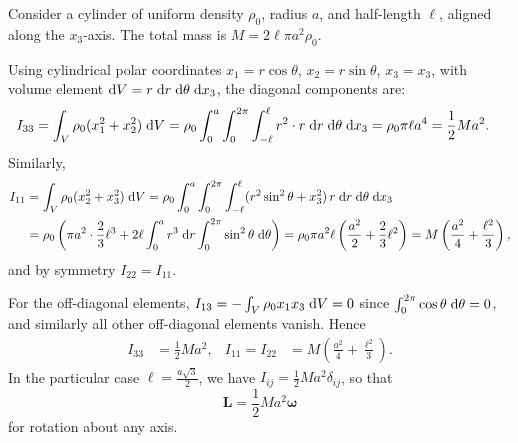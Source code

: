 \documentclass[a4paper]{article}
\begin{document}
\begin{eg}
  Consider a cylinder of uniform density $\rho_0$, radius $a$, and half-length $\ell$, aligned along the $x_3$-axis. The total mass is $M = 2\ell \pi a^2 \rho_0$.
  \begin{center}
  \end{center}
  Using cylindrical polar coordinates $x_1 = r\cos \theta$, $x_2 = r\sin \theta$, $x_3 = x_3$, with volume element $\mathrm{d} V = r\;\mathrm{d} r\;\mathrm{d} \theta \;\mathrm{d} x_3$, the diagonal components are:
  \begin{align*}
    I_{33} &= \int_V \rho_0 (x_1^2 + x_2^2)\;\mathrm{d} V = \rho_0 \int_0^a \int_0^{2\pi} \int_{-\ell}^\ell r^2 \cdot r\;\mathrm{d} r\;\mathrm{d} \theta \;\mathrm{d} x_3 = \rho_0 \pi \ell a^4 = \frac{1}{2}Ma^2.
  \end{align*}
  Similarly,
  \begin{align*}
    I_{11} &= \int_V \rho_0 (x_2^2 + x_3^2)\;\mathrm{d} V = \rho_0 \int_0^a \int_0^{2\pi}\int_{-\ell}^\ell (r^2 \sin^2 \theta + x_3^2) \, r\;\mathrm{d} r\;\mathrm{d} \theta \;\mathrm{d} x_3\\
    &= \rho_0 \left(\pi a^2 \cdot \frac{2}{3}\ell^3 + 2\ell\int_0^a r^3 \;\mathrm{d} r\int_0^{2\pi}\sin^2 \theta \;\mathrm{d}\theta\right) = \rho_0 \pi a^2 \ell\left(\frac{a^2}{2} + \frac{2}{3}\ell^2\right) = M\left(\frac{a^2}{4} + \frac{\ell^2}{3}\right),
  \end{align*}
  and by symmetry $I_{22} = I_{11}$.

  For the off-diagonal elements, $I_{13} = -\int_V \rho_0 x_1 x_3 \;\mathrm{d} V = 0$ since $\int_0^{2\pi} \cos \theta\;\mathrm{d} \theta = 0$, and similarly all other off-diagonal elements vanish. Hence
  \begin{align*}
    I_{33} &= \frac{1}{2}Ma^2, &
    I_{11} = I_{22} &= M\left(\frac{a^2}{4} + \frac{\ell^2}{3}\right).
  \end{align*}
  In the particular case $\ell = \frac{a\sqrt{3}}{2}$, we have $I_{ij} = \frac{1}{2}Ma^2 \delta_{ij}$, so that
  \[
    \mathbf{L} = \frac{1}{2}Ma^2 \boldsymbol\omega
  \]
  for rotation about any axis.
\end{eg}
\end{document}
